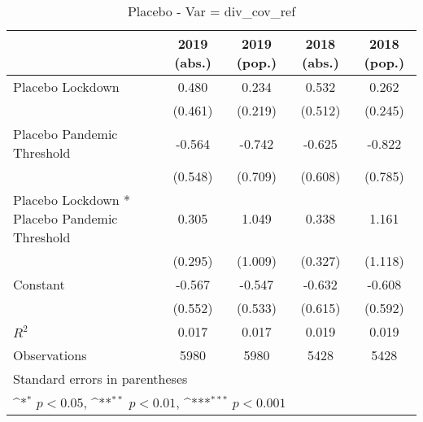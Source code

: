 \documentclass{article}
\begin{document}
{
\def\sym#1{\ifmmode^{#1}\else\(^{#1}\)\fi}
\begin{longtable}{l*{4}{c}}
\caption{Placebo - Var = div\_cov\_ref}\\
\hline\hline\endfirsthead\hline\endhead\hline\endfoot\endlastfoot
                &\multicolumn{1}{c}{2019 (abs.)}&\multicolumn{1}{c}{2019 (pop.)}&\multicolumn{1}{c}{2018 (abs.)}&\multicolumn{1}{c}{2018 (pop.)}\\
\hline
Placebo Lockdown&    0.480         &    0.234         &    0.532         &    0.262         \\
                &  (0.461)         &  (0.219)         &  (0.512)         &  (0.245)         \\
Placebo Pandemic Threshold&   -0.564         &   -0.742         &   -0.625         &   -0.822         \\
                &  (0.548)         &  (0.709)         &  (0.608)         &  (0.785)         \\
Placebo Lockdown * Placebo Pandemic Threshold&    0.305         &    1.049         &    0.338         &    1.161         \\
                &  (0.295)         &  (1.009)         &  (0.327)         &  (1.118)         \\
Constant        &   -0.567         &   -0.547         &   -0.632         &   -0.608         \\
                &  (0.552)         &  (0.533)         &  (0.615)         &  (0.592)         \\
\hline
\(R^{2}\)       &    0.017         &    0.017         &    0.019         &    0.019         \\
Observations    &     5980         &     5980         &     5428         &     5428         \\
\hline\hline
\multicolumn{5}{l}{\footnotesize Standard errors in parentheses}\\
\multicolumn{5}{l}{\footnotesize \sym{*} \(p<0.05\), \sym{**} \(p<0.01\), \sym{***} \(p<0.001\)}\\
\end{longtable}
}
\end{document}
